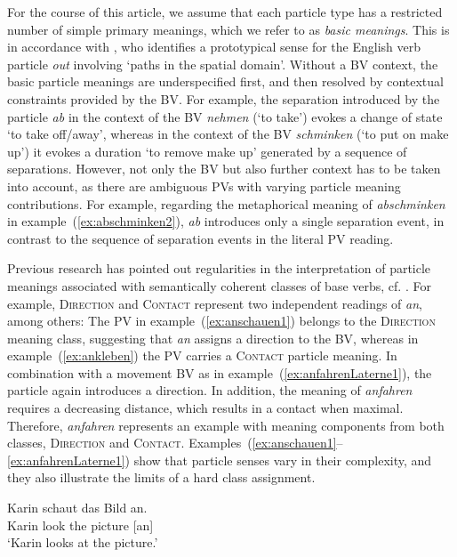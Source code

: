 \documentclass[output=paper]{langsci/langscibook}
\begin{document}
For the course of this article, we assume that each particle type has
a restricted number of simple primary meanings, which we refer to as
\textit{basic meanings}. This is in accordance with \cite{Lindner:83},
who identifies a prototypical sense for the English verb particle
\textit{out} involving `paths in the spatial domain'. Without a BV
context, the basic particle meanings are underspecified first, and
then resolved by contextual constraints provided by the BV. For
example, the separation introduced by the particle \textit{ab} in the
context of the BV \textit{nehmen} (`to take') evokes a change of state
`to take off/away', whereas in the context of the BV
\textit{schminken} (`to put on make up') it evokes a duration `to
remove make up' generated by a sequence of separations. However, not
only the BV but also further context has to be taken into account, as
there are ambiguous PVs with varying particle meaning
contributions. For example, regarding the metaphorical meaning of
\textit{abschminken} in example~(\ref{ex:abschminken2}), \textit{ab}
introduces only a single separation event, in contrast to the sequence
of separation events in the literal PV reading.

Previous research has pointed out regularities in the interpretation
of particle meanings associated with semantically coherent classes of
base verbs,
cf. \cite{Stiebels:96,Lechler/Rossdeutscher:09,Kliche:11,Springorum:11}.
For example, \textsc{Direction} and \textsc{Contact} represent two
independent readings of \textit{an}, among others: The PV in
example~(\ref{ex:anschauen1}) belongs to the \textsc{Direction}
meaning class, suggesting that \textit{an} assigns a direction to the
BV, whereas in example~(\ref{ex:ankleben}) the PV carries a
\textsc{Contact} particle meaning. In combination with a movement BV
as in example~(\ref{ex:anfahrenLaterne1}), the particle again
introduces a direction. In addition, the meaning of \textit{anfahren}
requires a decreasing distance, which results in a contact when
maximal. Therefore, \textit{anfahren} represents an example with
meaning components from both classes, \textsc{Direction} and
\textsc{Contact}. Examples~(\ref{ex:anschauen1}--\ref{ex:anfahrenLaterne1})
show that particle senses vary in their complexity, and they also
illustrate the limits of a hard class assignment.

\ea\label{ex:anschauen1}
\gll Karin schaut das Bild an.\\
Karin look the picture [an]\\
\glt `Karin looks at the picture.'
\z
\end{document}
